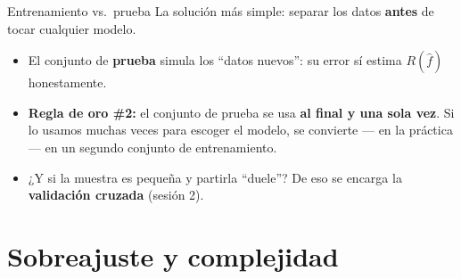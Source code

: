 \documentclass{beamer}
\newcommand{\1}{\mathbb{I}}
\begin{document}
\begin{frame}{Entrenamiento vs.\ prueba}
\small
La solución más simple: separar los datos \textbf{antes} de tocar cualquier modelo.

\vspace{0.3cm}
\begin{center}
\end{center}
\pause

\vspace{0.3cm}
\begin{itemize}\itemsep4pt
  \item El conjunto de \textbf{prueba} simula los ``datos nuevos'': su error sí estima $R(\hat{f})$ honestamente.
  \item \textbf{Regla de oro \#2:} el conjunto de prueba se usa \textbf{al final y una sola vez}. Si lo usamos muchas veces para escoger el modelo, se convierte --- en la práctica --- en un segundo conjunto de entrenamiento. \pause
  \item ¿Y si la muestra es pequeña y partirla ``duele''? De eso se encarga la \textbf{validación cruzada} (sesión 2).
\end{itemize}
\end{frame}


\section{Sobreajuste y complejidad}
\begin{frame}[noframenumbering]
\tableofcontents[currentsection]
\end{frame}
\end{document}
